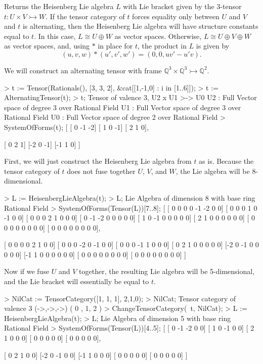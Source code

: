 Returns the Heisenberg Lie algebra $L$ with Lie bracket given by the 3-tensor $t:U\times V\rightarrowtail W$. 
If the tensor category of $t$ forces equality only between $U$ and $V$ and $t$ is alternating, then the Heisenberg Lie algebra will have structure constants equal to $t$.
In this case, $L\cong U\oplus W$ as vector spaces. 
Otherwise, $L\cong U\oplus V\oplus W$ as vector spaces, and, using $*$ in place for $t$, the product in $L$ is given by
\[ (u,v,w) * (u',v',w') = (0,0,uv'-u'v). \]

\begin{example}[CraftingLieAlgberas]

We will construct an alternating tensor with frame $\mathbb{Q}^3\times\mathbb{Q}^3\rightarrowtail \mathbb{Q}^2$. 
\begin{code}
> t := Tensor(Rationals(), [3, 3, 2], &cat[[1,-1,0] : i in [1..6]]);
> t := AlternatingTensor(t);
> t;
Tensor of valence 3, U2 x U1 >-> U0
U2 : Full Vector space of degree 3 over Rational Field
U1 : Full Vector space of degree 3 over Rational Field
U0 : Full Vector space of degree 2 over Rational Field
> SystemOfForms(t);
[
    [ 0 -1 -2]
    [ 1  0 -1]
    [ 2  1  0],

    [ 0  2  1]
    [-2  0 -1]
    [-1  1  0]
]
\end{code}

First, we will just construct the Heisenberg Lie algebra from $t$ as is. 
Because the tensor category of $t$ does not fuse together $U$, $V$, and $W$, the Lie algebra will be 8-dimensional.
\begin{code}
> L := HeisenbergLieAlgebra(t);
> L;
Lie Algebra of dimension 8 with base ring Rational Field
> SystemOfForms(Tensor(L))[7..8];
[
    [ 0  0  0  0 -1 -2  0  0]
    [ 0  0  0  1  0 -1  0  0]
    [ 0  0  0  2  1  0  0  0]
    [ 0 -1 -2  0  0  0  0  0]
    [ 1  0 -1  0  0  0  0  0]
    [ 2  1  0  0  0  0  0  0]
    [ 0  0  0  0  0  0  0  0]
    [ 0  0  0  0  0  0  0  0],

    [ 0  0  0  0  2  1  0  0]
    [ 0  0  0 -2  0 -1  0  0]
    [ 0  0  0 -1  1  0  0  0]
    [ 0  2  1  0  0  0  0  0]
    [-2  0 -1  0  0  0  0  0]
    [-1  1  0  0  0  0  0  0]
    [ 0  0  0  0  0  0  0  0]
    [ 0  0  0  0  0  0  0  0]
]
\end{code}

Now if we fuse $U$ and $V$ together, the resulting Lie algebra will be 5-dimensional, and the Lie bracket will essentially be equal to $t$.
\begin{code}
> NilCat := TensorCategory([1, 1, 1], {{2,1},{0}});
> NilCat;
Tensor category of valence 3 (->,->,->) ({ 0 },{ 1, 2 })
> ChangeTensorCategory(~t, NilCat);
> L := HeisenbergLieAlgebra(t);
> L;
Lie Algebra of dimension 5 with base ring Rational Field
> SystemOfForms(Tensor(L))[4..5];
[
    [ 0 -1 -2  0  0]
    [ 1  0 -1  0  0]
    [ 2  1  0  0  0]
    [ 0  0  0  0  0]
    [ 0  0  0  0  0],

    [ 0  2  1  0  0]
    [-2  0 -1  0  0]
    [-1  1  0  0  0]
    [ 0  0  0  0  0]
    [ 0  0  0  0  0]
]
\end{code}
\end{example}

